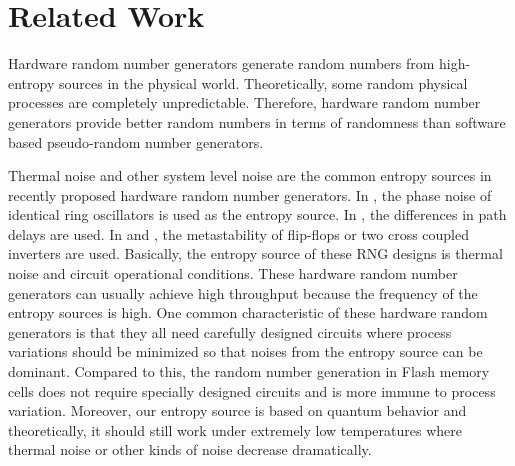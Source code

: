 \section{Related Work}

Hardware random number generators generate random numbers from high-entropy sources in the physical world. Theoretically, some random physical processes are completely unpredictable. Therefore, hardware random number generators provide better random numbers in terms of randomness than software based pseudo-random number generators.

Thermal noise and other system level noise are the common entropy sources in recently proposed hardware random number generators. In \cite{sunar2007provably}, the phase noise of identical ring oscillators is used as the entropy source. In \cite{o2004puf}, the differences in path delays are used. In \cite{majzoobi2011fpga} and \cite{intelrng}, the metastability of flip-flops or two cross coupled inverters are used. Basically, the entropy source of these RNG designs is thermal noise and circuit operational conditions. These hardware random number generators can usually achieve high throughput because the frequency of the entropy sources is high. One common characteristic of these hardware random generators is that they all need carefully designed circuits where process variations should be minimized so that noises from the entropy source can be dominant. Compared to this, the random number generation in Flash memory cells does not require specially designed circuits and is more immune to process variation. Moreover, our entropy source is based on quantum behavior and theoretically, it should still work under extremely low temperatures where thermal noise or other kinds of noise decrease dramatically.
